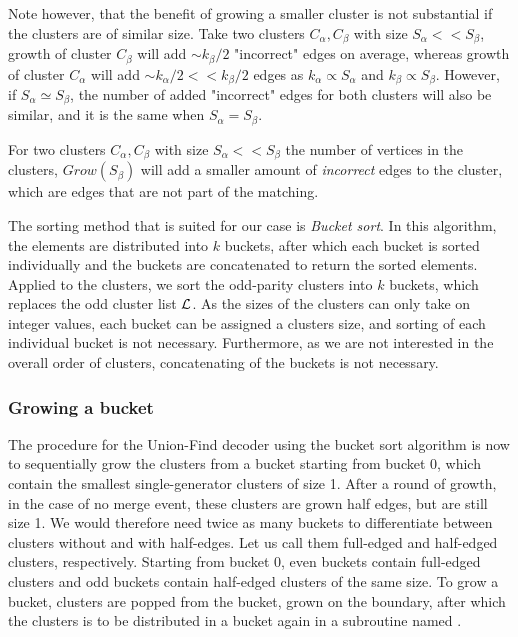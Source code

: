 Note however, that the benefit of growing a smaller cluster is not substantial if the clusters are of similar size. Take two clusters $C_\alpha, C_\beta$ with size $S_\alpha <<S_\beta$, growth of cluster $C_\beta$ will add $\sim k_{\beta}/2$ "incorrect" edges on average, whereas growth of cluster $C_\alpha$ will add $\sim k_{\alpha}/2 << k_{\beta}/2$ edges as $k_{\alpha} \propto S_\alpha$ and $k_{\beta} \propto S_\beta$. However, if $S_\alpha \simeq S_\beta$, the number of added "incorrect" edges for both clusters will also be similar, and it is the same when $S_\alpha = S_\beta$.

\begin{lemma}\label{lem:incorrectedges}
  For two clusters $C_\alpha, C_\beta$ with size $S_\alpha << S_\beta$ the number of vertices in the clusters, $Grow(S_\beta)$ will add a smaller amount of \emph{incorrect} edges to the cluster, which are edges that are not part of the matching.
\end{lemma}

The sorting method that is suited for our case is \emph{Bucket sort}. In this algorithm, the elements are distributed into $k$ buckets, after which each bucket is sorted individually and the buckets are concatenated to return the sorted elements. Applied to the clusters, we sort the odd-parity clusters into $k$ buckets, which replaces the odd cluster list $\mathcal{L}$. As the sizes of the clusters can only take on integer values, each bucket can be assigned a clusters size, and sorting of each individual bucket is not necessary. Furthermore, as we are not interested in the overall order of clusters, concatenating of the buckets is not necessary.

\subsubsection{Growing a bucket}
The procedure for the Union-Find decoder using the bucket sort algorithm is now to sequentially grow the clusters from a bucket starting from bucket 0, which contain the smallest single-generator clusters of size 1. After a round of growth, in the case of no merge event, these clusters are grown half edges, but are still size 1. We would therefore need twice as many buckets to differentiate between clusters without and with half-edges. Let us call them full-edged and half-edged clusters, respectively. Starting from bucket 0, even buckets contain full-edged clusters and odd buckets contain half-edged clusters of the same size. To grow a bucket, clusters are popped from the bucket, grown on the boundary, after which the clusters is to be distributed in a bucket again in a subroutine named .

